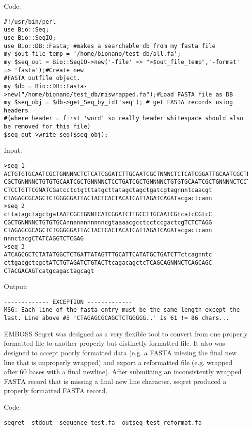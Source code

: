 Code:
\begin{verbatim}
#!/usr/bin/perl
use Bio::Seq;
use Bio::SeqIO;
use Bio::DB::Fasta; #makes a searchable db from my fasta file
my $out_file_temp = '/home/bionano/test_db/all.fa';
my $seq_out = Bio::SeqIO->new('-file' => ">$out_file_temp",'-format' => 'fasta');#Create new 
#FASTA outfile object.
my $db = Bio::DB::Fasta->new("/home/bionano/test_db/miswrapped.fa");#Load FASTA file as DB
my $seq_obj = $db->get_Seq_by_id('seq'); # get FASTA records using headers 
#(where header = first 'word' so really header whitespace should also be removed for this file)
$seq_out->write_seq($seq_obj);
\end{verbatim}

Input: 
\begin{verbatim}
>seq 1
ACTGTGTGCAATCGCTGNNNNCTCTCATCGGATCTTGCAATCGCTNNNCTCTCATCGGATTGCAATCGCTNNNCTtcatcCGGAT
CGCTGNNNNCTGTGTGCAATCGCTGNNNNCTCCTGATCGCTGNNNNCTGTGTGCAATCGCTGNNNNCTCCTGCAATCGCTGNNNN
CTCCTGTTCGNATCGatcctctgtttatgcttatagctagctgatcgtagnnntcaacgt
CTAGAGCGCAGCTCTGGGGGATTACTACTCACTACATCATTAGATCAGATacgactcann
>seq 2
cttatagctagctgatAATCGCTGNNTCATCGGATCTTGCCTTGCAATCGtcatcCGtcC
CGCTGNNNNCTGTGTGCAnnnnnnnnnnncgtaaaacgcctcctccgactcgTCTCTAGG
CTAGAGCGCAGCTCTGGGGGATTACTACTCACTACATCATTAGATCAGATacgactcann
nnnctacgCTATCAGGTCTCGAG
>seq 3
ATCAGCGCTCTATATGGCTCTGATTATAGTTTGCATTCATATGCTGATCTTctcagnntc
cttgacgctcgctATCTGTAGATCTGTACTtcagacagctcTCAGCAGNNNCTCAGCAGC
CTACGACAGTcatgcagactagcagt
\end{verbatim}

Output:
\begin{verbatim}
------------- EXCEPTION -------------
MSG: Each line of the fasta entry must be the same length except the last. Line above #5 'CTAGAGCGCAGCTCTGGGGG..' is 61 != 86 chars...
\end{verbatim}

EMBOSS Seqret was designed as a very flexible tool to convert from one properly formatted file to another properly but distinctly formatted file. It also was designed to accept poorly formatted data (e.g. a FASTA missing the final new line that is improperly wrapped) and export a reformatted file (e.g. wrapped after 60 bases with a final newline). After submitting an inconsistently wrapped FASTA record that is missing a final new line character, seqret produced a properly formatted FASTA record.

Code:

\begin{verbatim}
seqret -stdout -sequence test.fa -outseq test_reformat.fa
\end{verbatim}

